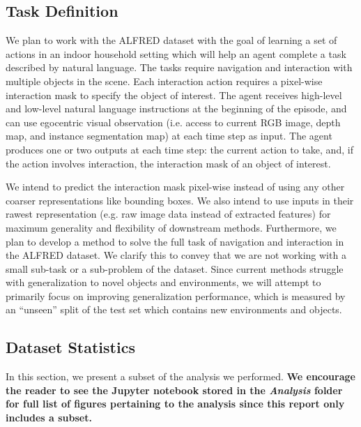 \documentclass[11pt,a4paper]{article}
\begin{document}
\subsection{Task Definition}


We plan to work with the ALFRED dataset \cite{shridhar2020alfred} with the goal of learning a set of actions in an indoor household setting which will help an agent complete a task described by natural language. The tasks require navigation and interaction with multiple objects in the scene. Each interaction action requires a pixel-wise interaction mask to specify the object of interest. The agent receives high-level and low-level natural language instructions at the beginning of the episode, and can use egocentric visual observation (i.e. access to current RGB image, depth map, and instance segmentation map) at each time step as input. The agent produces one or two outputs at each time step: the current action to take, and, if the action involves interaction, the interaction mask of an object of interest. 

We intend to predict the interaction mask pixel-wise instead of using any other coarser representations like bounding boxes. We also intend to use inputs in their rawest representation (e.g. raw image data instead of extracted features) for maximum generality and flexibility of downstream methods. Furthermore, we plan to develop a method to solve the full task of navigation and interaction in the ALFRED dataset. We clarify this to convey that we are not working with a small sub-task or a sub-problem of the dataset. Since current methods \cite{corona2020modularity, singh2020moca, shridhar2020alfred} struggle with generalization to novel objects and environments, we will attempt to primarily focus on improving generalization performance, which is measured by an ``unseen'' split of the test set which contains new environments and objects.

\subsection{Dataset Statistics}
In this section, we present a subset of the analysis we performed. \textbf{We encourage the reader to see the Jupyter notebook stored in the \emph{Analysis} folder for full list of figures pertaining to the analysis since this report only includes a subset.}
\end{document}
